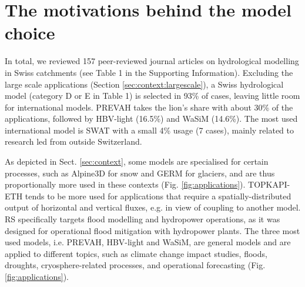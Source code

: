 \documentclass[10pt,a4paper]{article}
\begin{document}
\section{The motivations behind the model choice}
\label{sec:motivations}

In total, we reviewed 157 peer-reviewed journal articles on hydrological modelling in Swiss catchments (see Table 1 in the Supporting Information). Excluding the large scale applications (Section \ref{sec:context:largescale}), a Swiss hydrological model (category D or E in Table 1) is selected in 93\% of cases, leaving little room for international models. PREVAH takes the lion's share with about 30\% of the applications, followed by HBV-light (16.5\%) and WaSiM (14.6\%). The most used international model is SWAT with a small 4\% usage (7 cases), mainly related to research led from outside Switzerland.

As depicted in Sect. \ref{sec:context}, some models are specialised for certain processes, such as Alpine3D for snow and GERM for glaciers, and are thus proportionally more used in these contexts (Fig. \ref{fig:applications}). TOPKAPI-ETH tends to be more used for applications that require a spatially-distributed output of horizontal and vertical fluxes, e.g. in view of coupling to another model. RS specifically targets flood modelling and hydropower operations, as it was designed for operational flood mitigation with hydropower plants. The three most used models, i.e. PREVAH, HBV-light and WaSiM, are general models and are applied to different topics, such as climate change impact studies, floods, droughts, cryosphere-related processes, and operational forecasting (Fig. \ref{fig:applications}).
\end{document}
